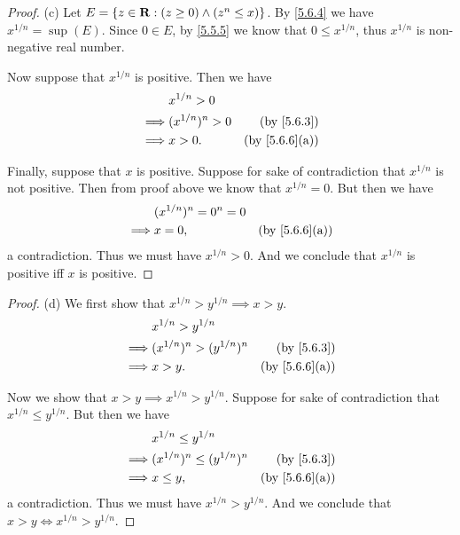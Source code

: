 \begin{proof}{(c)}
  Let \(E = \{z \in \mathbf{R} : (z \geq 0) \land (z^n \leq x)\}\).
  By \cref{5.6.4} we have \(x^{1 / n} = \sup(E)\).
  Since \(0 \in E\), by \cref{5.5.5} we know that \(0 \leq x^{1 / n}\), thus \(x^{1 / n}\) is non-negative real number.

  Now suppose that \(x^{1 / n}\) is positive.
  Then we have
  \begin{align*}
             & x^{1 / n} > 0                                   \\
    \implies & (x^{1 / n})^n > 0 & \text{(by \cref{5.6.3})}    \\
    \implies & x > 0.            & \text{(by \cref{5.6.6}(a))} \\
  \end{align*}

  Finally, suppose that \(x\) is positive.
  Suppose for sake of contradiction that \(x^{1 / n}\) is not positive.
  Then from proof above we know that \(x^{1 / n} = 0\).
  But then we have
  \begin{align*}
             & (x^{1 / n})^n = 0^n = 0                               \\
    \implies & x = 0,                  & \text{(by \cref{5.6.6}(a))}
  \end{align*}
  a contradiction.
  Thus we must have \(x^{1 / n} > 0\).
  And we conclude that \(x^{1 / n}\) is positive iff \(x\) is positive.
\end{proof}

\begin{proof}{(d)}
  We first show that \(x^{1 / n} > y^{1 / n} \implies x > y\).
  \begin{align*}
             & x^{1 / n} > y^{1 / n}                                       \\
    \implies & (x^{1 / n})^n > (y^{1 / n})^n & \text{(by \cref{5.6.3})}    \\
    \implies & x > y.                        & \text{(by \cref{5.6.6}(a))}
  \end{align*}

  Now we show that \(x > y \implies x^{1 / n} > y^{1 / n}\).
  Suppose for sake of contradiction that \(x^{1 / n} \leq y^{1 / n}\).
  But then we have
  \begin{align*}
             & x^{1 / n} \leq y^{1 / n}                                       \\
    \implies & (x^{1 / n})^n \leq (y^{1 / n})^n & \text{(by \cref{5.6.3})}    \\
    \implies & x \leq y,                        & \text{(by \cref{5.6.6}(a))}
  \end{align*}
  a contradiction.
  Thus we must have \(x^{1 / n} > y^{1 / n}\).
  And we conclude that \(x > y \iff x^{1 / n} > y^{1 / n}\).
\end{proof}

